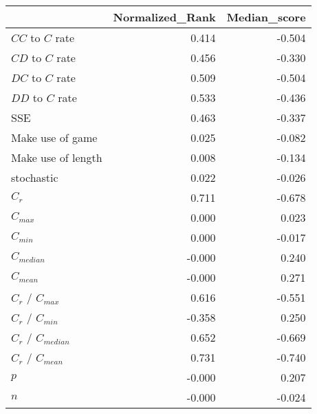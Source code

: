 \begin{tabular}{lrr}
\toprule
{} &  Normalized_Rank &  Median_score \\
\midrule
$CC$ to $C$ rate     &            0.414 &        -0.504 \\
$CD$ to $C$ rate     &            0.456 &        -0.330 \\
$DC$ to $C$ rate     &            0.509 &        -0.504 \\
$DD$ to $C$ rate     &            0.533 &        -0.436 \\
SSE                  &            0.463 &        -0.337 \\
Make use of game     &            0.025 &        -0.082 \\
Make use of length   &            0.008 &        -0.134 \\
stochastic           &            0.022 &        -0.026 \\
$C_r$                &            0.711 &        -0.678 \\
$C_{max}$            &            0.000 &         0.023 \\
$C_{min}$            &            0.000 &        -0.017 \\
$C_{median}$         &           -0.000 &         0.240 \\
$C_{mean}$           &           -0.000 &         0.271 \\
$C_r$ / $C_{max}$    &            0.616 &        -0.551 \\
$C_r$ / $C_{min}$    &           -0.358 &         0.250 \\
$C_r$ / $C_{median}$ &            0.652 &        -0.669 \\
$C_r$ / $C_{mean}$   &            0.731 &        -0.740 \\
$p$                  &           -0.000 &         0.207 \\
$n$                  &           -0.000 &        -0.024 \\
\bottomrule
\end{tabular}
